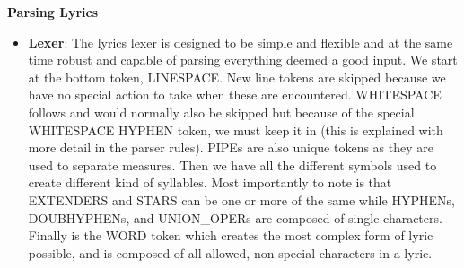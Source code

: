 \documentclass[12pt]{book}
\begin{document}
\newpage

\newpage
\centerline{{\large \bf Parsing Lyrics}}

\begin{itemize}
\item {\bf Lexer}: The lyrics lexer is designed to be simple and flexible and at the same time robust and capable of parsing everything deemed a good input. We start at the bottom token, LINESPACE. New line tokens are skipped because we have no special action to take when these are encountered. WHITESPACE follows and would normally also be skipped but because of the special WHITESPACE HYPHEN token, we must keep it in (this is explained with more detail in the parser rules). PIPEs are also unique tokens as they are used to separate measures. Then we have all the different symbols used to create different kind of syllables. Most importantly to note is that EXTENDERS and STARS can be one or more of the same while HYPHENs, DOUBHYPHENs, and UNION\_OPERs are composed of single characters. Finally is the WORD token which creates the most complex form of lyric possible, and is composed of all allowed, non-special characters in a lyric.


\end{itemize}
\end{document}

